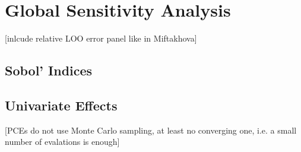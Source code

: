 \section{Global Sensitivity Analysis}
\thispagestyle{plain} %

[inlcude relative LOO error panel like in Miftakhova]


\subsection{Sobol' Indices}

\subsection{Univariate Effects}


[PCEs do not use Monte Carlo sampling, at least no converging one, i.e. a small number of evalations is enough]